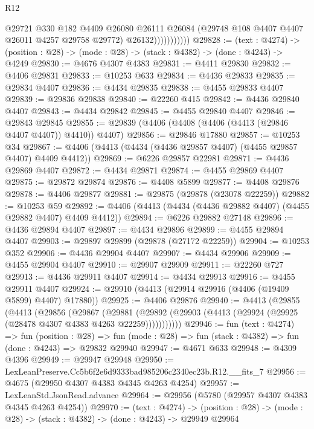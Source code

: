 \begin{lexlean}{R12}
\begin{coremodule}
                        @29721
                          @330
                          @182
                          @4409
                          @26080
                          @26111
                          @26084
                          (@29748 @108 @4407 @4407 @26011 @4257 @29758 @29772)
                          @26132)))))))))))
@29828 := (text : @4274) ->
  (position : @28) -> (mode : @28) -> (stack : @4382) -> (done : @4243) -> @4249
@29830 := @4676 @4307 @4383
@29831 := @4411 @29830
@29832 := @4406 @29831
@29833 := @10253 @633
@29834 := @4436 @29833
@29835 := @29834 @4407
@29836 := @4434 @29835
@29838 := @4455 @29833 @4407
@29839 := @29836 @29838
@29840 := @22260 @415
@29842 := @4436 @29840 @4407
@29843 := @4434 @29842
@29845 := @4455 @29840 @4407
@29846 := @29843 @29845
@29855 := @29839 (@4406 (@4408 (@4406 (@4413 (@29846 @4407 @4407)) @4410)) @4407)
@29856 := @29846 @17880
@29857 := @10253 @34
@29867 := @4406 (@4413 (@4434 (@4436 @29857 @4407) (@4455 @29857 @4407) @4409 @4412))
@29869 := @6226 @29857 @22981
@29871 := @4436 @29869 @4407
@29872 := @4434 @29871
@29874 := @4455 @29869 @4407
@29875 := @29872 @29874
@29876 := @4408 @5899
@29877 := @4408 @29876
@29878 := @4406 @29877
@29881 := @29875 (@29878 (@23078 @22259))
@29882 := @10253 @59
@29892 := @4406 (@4413 (@4434 (@4436 @29882 @4407) (@4455 @29882 @4407) @4409 @4412))
@29894 := @6226 @29882 @27148
@29896 := @4436 @29894 @4407
@29897 := @4434 @29896
@29899 := @4455 @29894 @4407
@29903 := @29897 @29899 (@29878 (@27172 @22259))
@29904 := @10253 @352
@29906 := @4436 @29904 @4407
@29907 := @4434 @29906
@29909 := @4455 @29904 @4407
@29910 := @29907 @29909
@29911 := @22260 @727
@29913 := @4436 @29911 @4407
@29914 := @4434 @29913
@29916 := @4455 @29911 @4407
@29924 := @29910 (@4413 (@29914 @29916 (@4406 (@19409 @5899) @4407) @17880))
@29925 := @4406 @29876
@29940 := @4413
    (@29855
      (@4413
        (@29856
          (@29867
            (@29881
              (@29892 (@29903 (@4413 (@29924 (@29925 (@28478 @4307 @4383 @4263 @22259)))))))))))
@29946 := fun (text : @4274) =>
  fun (position : @28) =>
  fun (mode : @28) => fun (stack : @4382) => fun (done : @4243) => @29832 @29940
@29947 := @4671 @633
@29948 := @4309 @4396
@29949 := @29947 @29948
@29950 := LexLeanPreserve.Cc5b6f2e6d9333bad985206c2340ec23b.R12.__fits_7
@29956 := @4675 (@29950 @4307 @4383 @4345 @4263 @4254)
@29957 := LexLeanStd.JsonRead.advance
@29964 := @29956 (@5780 (@29957 @4307 @4383 @4345 @4263 @4254))
@29970 := (text : @4274) ->
  (position : @28) -> (mode : @28) -> (stack : @4382) -> (done : @4243) -> @29949 @29964

\end{coremodule}
\end{lexlean}
